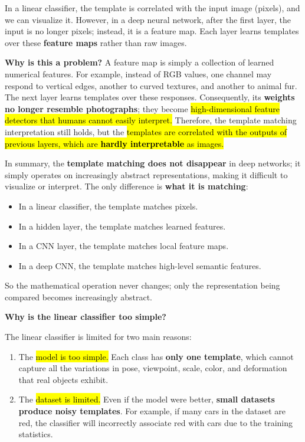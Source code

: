 \highspace
In a linear classifier, the template is correlated with the input image (pixels), and we can visualize it. However, in a deep neural network, after the first layer, the input is no longer pixels; instead, it is a feature map. Each layer learns templates over these \textbf{feature maps} rather than raw images.

\highspace
\textcolor{Red2}{ \textbf{Why is this a problem?}} A feature map is simply a collection of learned numerical features. For example, instead of RGB values, one channel may respond to vertical edges, another to curved textures, and another to animal fur. The next layer learns templates over these responses. Consequently, its \textbf{weights no longer resemble photographs}; they become \hl{high-dimensional feature detectors that humans cannot easily interpret.} Therefore, the template matching interpretation still holds, but the \hl{templates are correlated with the outputs of previous layers, which are \textbf{hardly interpretable} as images.}

\highspace
In summary, the \textbf{template matching does not disappear} in deep networks; it simply operates on increasingly abstract representations, making it difficult to visualize or interpret. The only difference is \textbf{what it is matching}:
\begin{itemize}
    \item In a linear classifier, the template matches pixels.
    \item In a hidden layer, the template matches learned features.
    \item In a CNN layer, the template matches local feature maps.
    \item In a deep CNN, the template matches high-level semantic features.
\end{itemize}
So the mathematical operation never changes; only the representation being compared becomes increasingly abstract.

\highspace
\begin{flushleft}
    \textcolor{Red2}{ \textbf{Why is the linear classifier too simple?}}
\end{flushleft}
The linear classifier is limited for two main reasons:
\begin{enumerate}
    \item The \hl{model is too simple.} Each class has \textbf{only one template}, which cannot capture all the variations in pose, viewpoint, scale, color, and deformation that real objects exhibit.
    \item The \hl{dataset is limited.} Even if the model were better, \textbf{small datasets produce noisy templates}. For example, if many cars in the dataset are red, the classifier will incorrectly associate red with cars due to the training statistics.
\end{enumerate}

